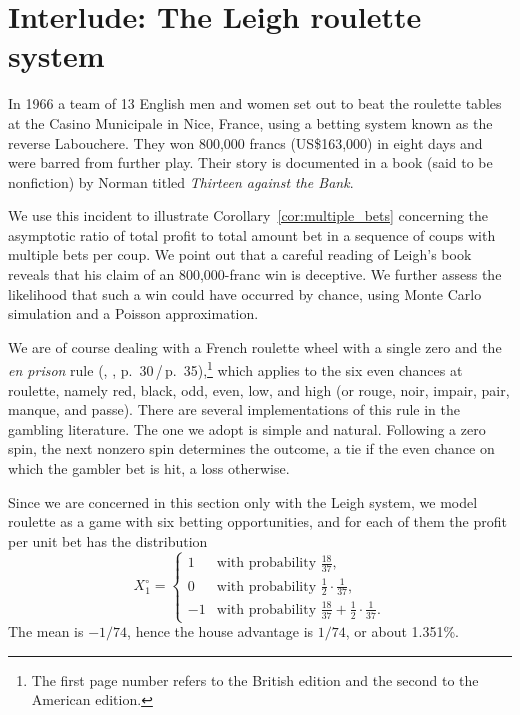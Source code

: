 \documentclass{article}
\theoremstyle{definition}
\theoremstyle{remark}
\begin{document}
\section{Interlude: The Leigh roulette system}\label{sec:Leigh}

In 1966 a team of 13 English men and women set out to beat the roulette tables at the Casino Municipale in Nice, France, using a betting system known as the reverse Labouchere.  They won 800,000 francs (US\$163,000) in eight days and were barred from further play.  Their story is documented in a book (said to be nonfiction) by Norman \cite{L76} titled \textit{Thirteen against the Bank}. 

We use this incident to illustrate Corollary~\ref{cor:multiple_bets} concerning the asymptotic ratio of total profit to total amount bet in a sequence of coups with multiple bets per coup.  We point out that a careful reading of Leigh's book reveals that his claim of an 800,000-franc win is deceptive.   We further assess the likelihood that such a win could have occurred by chance, using Monte Carlo simulation and a Poisson approximation. 

We are of course dealing with a French roulette wheel with a single zero and the \textit{en prison} rule (\citeauthor{L76}, \citeyear{L76}, p.~30\,/\,p.~35),\footnote{The first page number refers to the British edition and the second to the American edition.} which applies to the six even chances at roulette, namely red, black, odd, even, low, and high (or rouge, noir, impair, pair, manque, and passe).  There are several implementations of this rule in the gambling literature.  The one we adopt is simple and natural.  Following a zero spin, the next nonzero spin determines the outcome, a tie if the even chance on which the gambler bet is hit, a loss otherwise.

Since we are concerned in this section only with the Leigh system, we model roulette as a game with six betting opportunities, and for each of them the profit per unit bet has the distribution
\begin{equation}\label{Xcirc-dist}
X_1^\circ=\begin{cases}
1 & \text{with probability $\tfrac{18}{37}$},\\[4pt]
0 & \text{with probability $\tfrac{1}{2}\cdot\tfrac{1}{37}$},\\[4pt]
-1 & \text{with probability $\tfrac{18}{37}+\tfrac{1}{2}\cdot\tfrac{1}{37}$}.
\end{cases}
\end{equation}
The mean is $-1/74$, hence the house advantage is $1/74$, or about 1.351\%.
\end{document}
